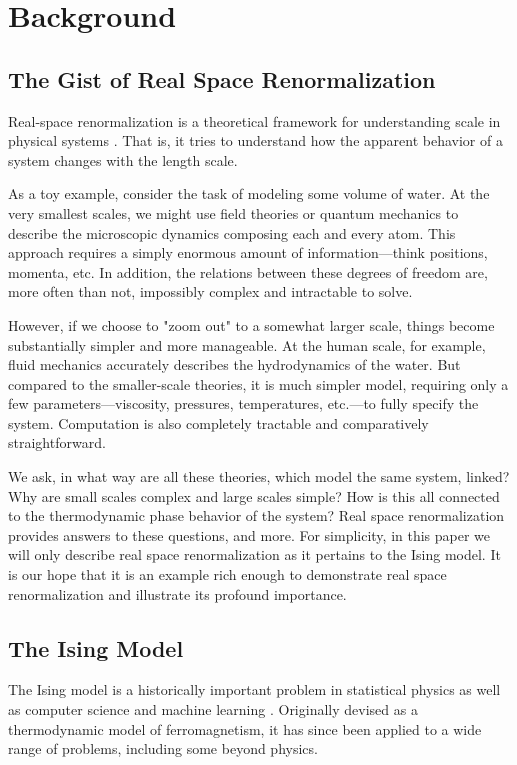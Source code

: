 \documentclass[%
    reprint,
    amsmath,amssymb,
    aps,
]{revtex4-2}
\begin{document}
\section{Background}

\subsection{The Gist of Real Space Renormalization}

Real-space renormalization is a theoretical framework for understanding scale in physical systems \cite{fisher-rg, wilson-rg}. That is, it tries to understand how the apparent behavior of a system changes with the length scale. 

As a toy example, consider the task of modeling some volume of water.
At the very smallest scales, we might use field theories or quantum mechanics to describe the microscopic dynamics composing each and every atom. 
This approach requires a simply enormous amount of information—think positions, momenta, etc. 
In addition, the relations between these degrees of freedom are, more often than not, impossibly complex and intractable to solve. 

However, if we choose to "zoom out" to a somewhat larger scale, things become substantially simpler and more manageable. 
At the human scale, for example, fluid mechanics accurately describes the hydrodynamics of the water. 
But compared to the smaller-scale theories, it is much simpler model, requiring only a few parameters—viscosity, pressures, temperatures, etc.—to fully specify the system. 
Computation is also completely tractable and comparatively straightforward. 

We ask, in what way are all these theories, which model the same system, linked? 
Why are small scales complex and large scales simple? 
How is this all connected to the thermodynamic phase behavior of the system? 
Real space renormalization provides answers to these questions, and more. 
For simplicity, in this paper we will only describe real space renormalization as it pertains to the Ising model. 
It is our hope that it is an example rich enough to demonstrate real space renormalization and illustrate its profound importance. 

\subsection{The Ising Model}

The Ising model is a historically important problem in statistical physics as well as computer science and machine learning \cite{brush-ising, ising}. 
Originally devised as a thermodynamic model of ferromagnetism, it has since been applied to a wide range of problems, including some beyond physics.
\end{document}
